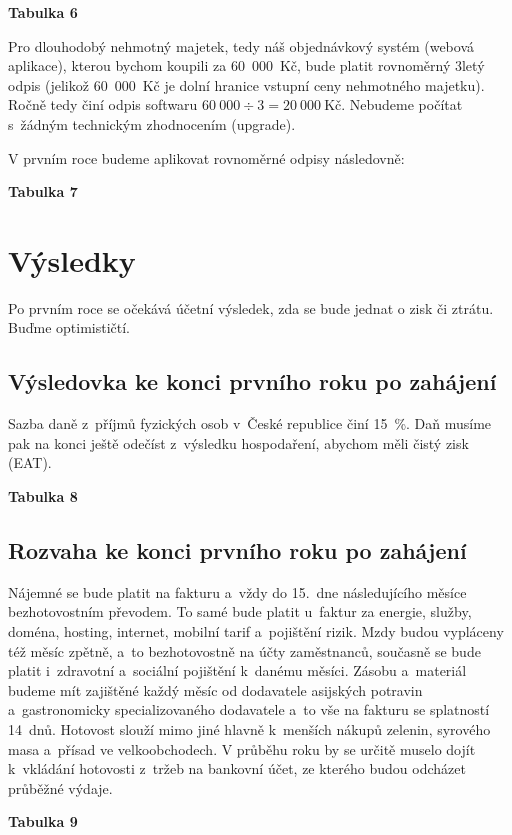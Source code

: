 \textbf{Tabulka 6}

Pro dlouhodobý nehmotný majetek, tedy náš objednávkový systém (webová aplikace), kterou bychom koupili za 60~000~Kč, bude platit rovnoměrný 3letý odpis (jelikož 60~000~Kč je dolní hranice vstupní ceny nehmotného majetku). Ročně tedy činí odpis softwaru $60~000 \div 3 = 20~000~\text{Kč}$. Nebudeme počítat s~žádným technickým zhodnocením (upgrade).

V prvním roce budeme aplikovat rovnoměrné odpisy následovně:

\textbf{Tabulka 7}





\section{Výsledky}

Po prvním roce se očekává účetní výsledek, zda se bude jednat o zisk či ztrátu. Buďme optimističtí.

\subsection{Výsledovka ke konci prvního roku po zahájení}
Sazba daně z~příjmů fyzických osob v~České republice činí 15~\%. Daň musíme pak na konci ještě odečíst z~výsledku hospodaření, abychom měli čistý zisk (EAT).

\textbf{Tabulka 8}

\subsection{Rozvaha ke konci prvního roku po zahájení}
Nájemné se bude platit na fakturu a~vždy do 15.~dne následujícího měsíce bezhotovostním převodem. To samé bude platit u~faktur za energie, služby, doména, hosting, internet, mobilní tarif a~pojištění rizik. Mzdy budou vypláceny též měsíc zpětně, a~to bezhotovostně na účty zaměstnanců, současně se bude platit i~zdravotní a~sociální pojištění k~danému měsíci. Zásobu a~materiál budeme mít zajištěné každý měsíc od dodavatele asijských potravin a~gastronomicky specializovaného dodavatele a~to vše na fakturu se splatností 14~dnů. Hotovost slouží mimo jiné hlavně k~menších nákupů zelenin, syrového masa a~přísad ve velkoobchodech. V průběhu roku by se určitě muselo dojít k~vkládání hotovosti z~tržeb na bankovní účet, ze kterého budou odcházet průběžné výdaje.

\textbf{Tabulka 9}

